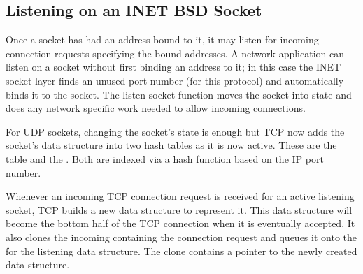 \subsection{Listening on an INET BSD Socket}
Once a socket has had an address bound to it, it may listen for incoming connection 
requests specifying the bound addresses.
A network application can listen on a socket without first binding an address to it; in this
case the INET socket layer finds an unused port number (for this protocol) and automatically
binds it to the socket.
The listen socket function moves the socket into state  and does any 
network specific work needed to allow incoming connections.

For UDP sockets, changing the socket's state is enough but TCP now adds the socket's
 data structure into two hash tables as it is now active.
These are the  table and the 
.
Both are indexed via a hash function based on the IP port number.

Whenever an incoming TCP connection request is received for an active listening socket,
TCP builds a new  data structure to represent it.
This  data structure will become the bottom half of the TCP connection when it is
eventually accepted.
It also clones the incoming  containing the connection request and queues it onto
the  for the listening  data structure.
The clone  contains a pointer to the newly created  data structure.


